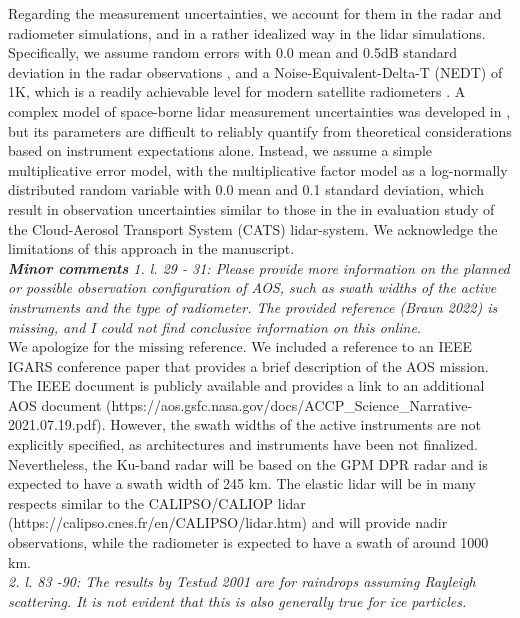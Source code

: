 \documentclass[12pt]{article}
\begin{document}
Regarding the measurement uncertainties, we account for them in the radar and radiometer simulations,
and in a rather idealized way in the lidar simulations.  Specifically, we assume random errors with 0.0 mean
and 0.5dB standard deviation in the radar observations \cite{takahashi2008}, and a Noise-Equivalent-Delta-T (NEDT)
of 1K, which is a readily achievable level for modern satellite radiometers \cite{draper2015}.
A complex model of space-borne lidar measurement uncertainties was developed in \cite{liu2006}, but its parameters are
difficult to reliably quantify from theoretical considerations based on instrument expectations alone. Instead, we
assume a simple multiplicative error model, with the multiplicative factor model as a log-normally distributed random
variable with 0.0 mean and 0.1 standard deviation, which result in observation uncertainties similar to those in
the in evaluation study of the Cloud-Aerosol Transport System (CATS) lidar-system. 
We acknowledge the limitations of this approach in the manuscript.\\ 
\newline
\textit{\textbf{Minor comments}
    1. l. 29 - 31: Please provide more information on the planned or possible observation configuration of AOS, such as swath
     widths of the active instruments and the type of radiometer. The provided reference (Braun 2022) is missing, and I 
     could not find conclusive information on this online.}\\
\newline
We apologize for the missing reference.  We included a reference to an IEEE IGARS conference paper \cite{braun2022} that provides a brief description of the AOS mission.
The IEEE document is publicly available and provides a link to an additional AOS document (https://aos.gsfc.nasa.gov/docs/ACCP\_Science\_Narrative-2021.07.19.pdf). 
However, the swath widths of the active instruments are not explicitly specified, as architectures and instruments have been not finalized.  Nevertheless,
the Ku-band radar will be based on the GPM DPR radar and is expected to have a swath width of 245 km.  The elastic lidar will be in many respects 
similar to the CALIPSO/CALIOP lidar (https://calipso.cnes.fr/en/CALIPSO/lidar.htm) and will provide nadir observations,  while the radiometer is expected 
to have a swath of around 1000 km.\\
\newline
\textit{2. l. 83 -90: The results by Testud 2001 are for raindrops assuming Rayleigh scattering. It is not evident that this 
    is also generally true for ice particles.}\\
\end{document}
